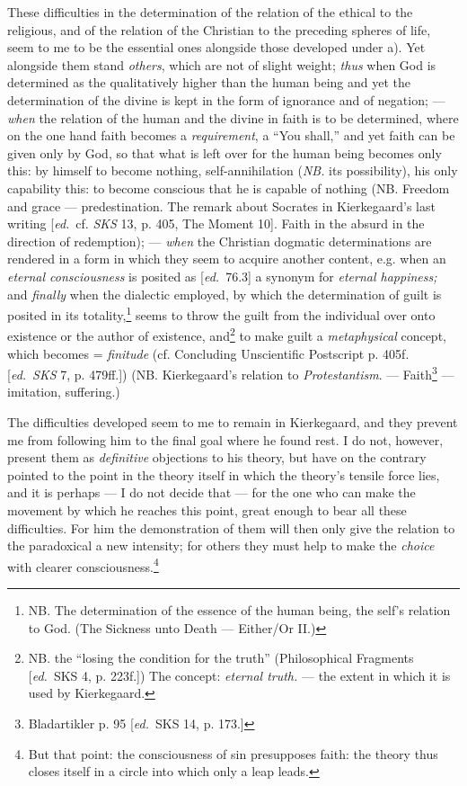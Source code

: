 \documentclass[12pt,a4paper,openany]{book}
\newcommand{\kpage}[1]{\marginnote{\footnotesize\textit{[#1]}}}
\newcommand{\ed}[1]{{\small[\textit{ed.}\ #1]}}
\begin{document}
\kpage{175}These difficulties in the determination of the relation of the ethical to
the religious, and of the relation of the Christian to the preceding spheres of life,
seem to me to be the essential ones alongside those developed under
a). Yet alongside them stand \emph{others}, which are not
of slight weight; \emph{thus} when God is determined as the qualitatively
higher than the human being and yet the determination of the divine
is kept in the form of ignorance and of negation; --- \emph{when} the relation of the human
and the divine in faith is to be determined,
where on the one hand faith becomes a \emph{requirement}, a ``You shall,'' and yet
faith can be given only by God, so that what is left over for
the human being becomes only this: by himself to become nothing, self-annihilation
(\emph{NB.} its possibility), his only capability this: to become
conscious that he is capable of nothing (NB. Freedom and grace --- predestination.
The remark about Socrates in Kierkegaard's last writing
\ed{cf. \emph{SKS} 13, p. 405, The Moment 10}. Faith in the absurd in the direction
of redemption); --- \emph{when} the Christian dogmatic determinations
are rendered in a form in which they seem to acquire another content,
e.g. when an \emph{eternal consciousness} is posited as \ed{76.3} a synonym for \emph{eternal happiness;}
and \emph{finally} when the dialectic employed, by which the determination
of guilt is posited in its totality,\footnote[137]{NB. The determination of the essence of the human being, the self's relation to God. (The Sickness unto Death --- Either/Or II.)} seems to throw the guilt from the individual
over onto existence or the author of existence, and\footnote[138]{NB. the ``losing the condition for the truth'' (Philosophical Fragments \ed{SKS 4, p. 223f.}) The concept: \emph{eternal truth.} --- the extent in which it is used by Kierkegaard.} to make
guilt a \emph{metaphysical} concept, which becomes = \emph{finitude} (cf. Concluding
Unscientific Postscript p. 405f. \ed{\emph{SKS} 7, p. 479ff.}) (NB.
Kierkegaard's relation to \emph{Protestantism}. --- Faith\footnote[139]{Bladartikler p. 95 \ed{SKS 14, p. 173.}} --- imitation,
suffering.)

The difficulties developed seem to me to remain
in Kierkegaard, and they prevent me from following him to the
final goal where he found rest. I do not, however, present them as
\emph{definitive} objections to his theory, but have on the contrary pointed
to the point in the theory itself in which the theory's tensile force
lies, and it is perhaps --- I do not decide that --- for the one who can
\kpage{176}make the movement by which he reaches this point, great
enough to bear all these difficulties. For him the demonstration
of them will then only give the relation to the paradoxical a new intensity; for
others they must help to make the \emph{choice} with clearer consciousness.\footnote[140]{But that point: the consciousness of sin presupposes faith: the theory thus closes itself in a circle into which only a leap leads.}
\end{document}
